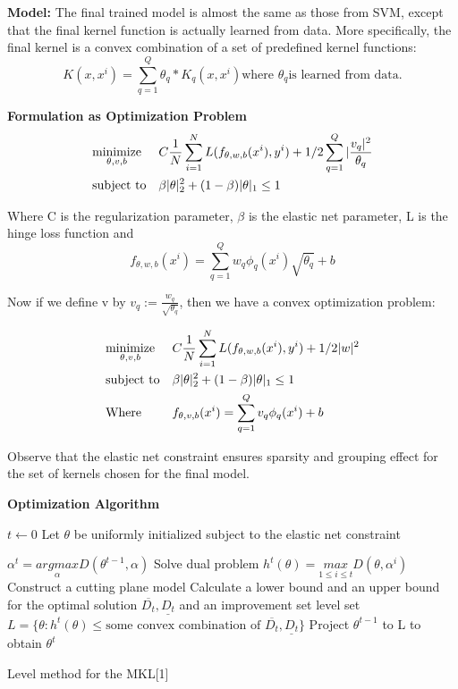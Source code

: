 \documentclass{article}
\begin{document}
\textbf{Model:}
The final trained model is almost the same as those from SVM, except that the
final kernel function is actually learned from data. More specifically, the
final kernel is a convex combination of a set of predefined kernel functions:
$$K(x, x^i) = \sum_{q=1}^{Q} \theta_q * K_q(x, x^i) \text{where }\theta_q
\text{is learned from data}.$$

\textbf{Formulation as Optimization Problem}
\begin{align*}
&\text{$\underset{\theta, v, b}{\text{minimize}}$} & &C  \frac{1}{N} \sum_{i=1}^{N} L(f_{\theta, w, b}(x^i), y^i) + 1/2 \sum_{q=1}^{Q}|\frac{v_q|^2}{\theta_q} \\
&\text{subject to} & &\beta|\theta|_2^2 + (1-\beta){|\theta|_1} \leq 1
\end{align*}


Where C is the regularization parameter, $\beta$ is the elastic net parameter,
L is the hinge loss function and $$f_{\theta, w, b}(x^i) = \sum_{q=1}^{Q} w_q
\phi_q(x^i) \sqrt{\theta_q} + b $$

Now if we define v by $v_q := \frac{w_q}{\sqrt{\theta_q}}$, then we have a
convex optimization problem:

\begin{align*}
&\text{$\underset{\theta, v, b}{\text{minimize}}$} & &C  \frac{1}{N} \sum_{i=1}^{N} L(f_{\theta, w, b}(x^i), y^i) + 1/2 |w|^2 \\
&\text{subject to} & &\beta|\theta|_2^2 + (1-\beta){|\theta|_1} \leq 1 \\
&\text{Where}  & &f_{\theta, v, b}(x^i) = \sum_{q=1}^{Q} v_q \phi_q(x^i)  + b
\end{align*}

Observe that the elastic net constraint ensures sparsity and grouping effect
for the set of kernels chosen for the final model.

\textbf{Optimization Algorithm}

\begin{algorithm}
\centering
\begin{algorithmic}[1]
    \item[] 
    \State $t \leftarrow 0$
    \State Let $\theta$ be uniformly initialized subject to the elastic net constraint

    \item[]
        \State $\alpha^{t} = \underset{\alpha}{argmax}D(\theta^{t-1}, \alpha)$
            \Comment Solve dual problem
        \State $h^t(\theta) = \underset{1 \leq i \leq t}{max} D(\theta, \alpha^i)$
            \Comment Construct a cutting plane model
        \State Calculate a lower bound and an upper bound for the optimal solution $\overline{D_t}, \underline{D_t}$ and an improvement set level set $L = \{\theta: h^t(\theta) \leq \text{some convex combination of }\overline{D_t}, \underline{D_t}\}$
        \State Project $\theta^{t-1}$ to L to obtain $\theta^t$
    \EndWhile
\end{algorithmic}
\caption{Level method for the MKL[1]}
\label{alg:gmkl}
\end{algorithm}
\end{document}
